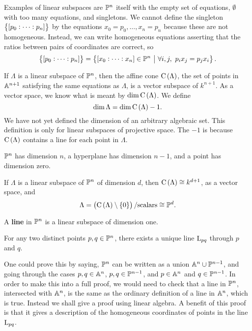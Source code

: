 \begin{example*}
Examples of linear subspaces are $ \PP^n $ itself with the empty set of equations, $ \emptyset $ with too many equations, and singletons. We cannot define the singleton $ \cbr{\sbr{p_0 : \dots : p_n}} $ by the equations $ x_0 = p_0, \dots, x_n = p_n $ because these are not homogeneous. Instead, we can write homogeneous equations asserting that the ratios between pairs of coordinates are correct, so
$$ \cbr{\sbr{p_0 : \dots : p_n}} = \cbr{\sbr{x_0 : \dots : x_n} \in \PP^n \st \forall i, j, \ p_ix_j = p_jx_i}. $$
\end{example*}

If $ \Lambda $ is a linear subspace of $ \PP^n $, then the affine cone $ \C\br{\Lambda} $, the set of points in $ \AA^{n + 1} $ satisfying the same equations as $ \Lambda $, is a vector subspace of $ k^{n + 1} $. As a vector space, we know what is meant by $ \dim \C\br{\Lambda} $. We define
$$ \dim \Lambda = \dim \C\br{\Lambda} - 1. $$
We have not yet defined the dimension of an arbitrary algebraic set. This definition is only for linear subspaces of projective space. The $ -1 $ is because $ \C\br{\Lambda} $ contains a line for each point in $ \Lambda $.

\begin{example*}
$ \PP^n $ has dimension $ n $, a hyperplane has dimension $ n - 1 $, and a point has dimension zero.
\end{example*}

If $ \Lambda $ is a linear subspace of $ \PP^n $ of dimension $ d $, then $ \C\br{\Lambda} \cong k^{d + 1} $, as a vector space, and
$$ \Lambda = \br{\C\br{\Lambda} \setminus \cbr{0}} / \text{scalars} \cong \PP^d. $$

\begin{definition*}
A \textbf{line} in $ \PP^n $ is a linear subspace of dimension one.
\end{definition*}


\begin{lemma}
For any two distinct points $ p, q \in \PP^n $, there exists a unique line $ \L_{pq} $ through $ p $ and $ q $.
\end{lemma}

One could prove this by saying, $ \PP^n $ can be written as a union $ \AA^n \cup \PP^{n - 1} $, and going through the cases $ p, q \in \AA^n $, $ p, q \in \PP^{n - 1} $, and $ p \in \AA^n $ and $ q \in \PP^{n - 1} $. In order to make this into a full proof, we would need to check that a line in $ \PP^n $, intersected with $ \AA^n $, is the same as the ordinary definition of a line in $ \AA^n $, which is true. Instead we shall give a proof using linear algebra. A benefit of this proof is that it gives a description of the homogeneous coordinates of points in the line $ \L_{pq} $.

